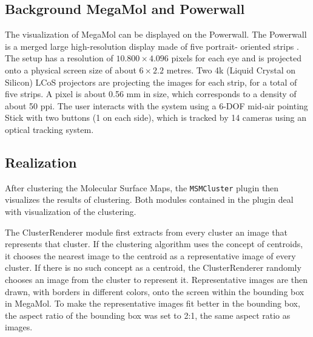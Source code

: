 \documentclass[journal]{vgtc}       %
\begin{document}
\subsection{Background MegaMol and Powerwall}

The visualization of MegaMol can be displayed on the Powerwall.
The  Powerwall is a merged large high-resolution display made of five portrait- oriented
strips . The setup has  a resolution of $10.800 \times 4.096 $ pixels
for each eye  and is projected onto a physical screen size of about $6 \times 2.2$ metres. 
Two 4k (Liquid Crystal on Silicon) LCoS projectors are projecting the images for each strip, for a total of five strips.
A pixel is about 0.56 mm  in size, which corresponds to a density of about 50 ppi.
The user interacts with the system using a 6-DOF mid-air
pointing Stick with two buttons (1 on each side), which is tracked by 14 cameras
using an optical tracking system. 




\subsection{Realization}

After clustering the Molecular Surface Maps, the \verb|MSMCluster| plugin then visualizes the results of clustering. Both modules contained in the plugin deal with visualization of the clustering. 

The ClusterRenderer module first extracts from every cluster an image that represents that cluster. If the clustering algorithm uses the concept of centroids, it chooses the nearest image to the centroid as a representative image of every cluster. If there is no such concept as a centroid, the  ClusterRenderer randomly chooses an image from the cluster to represent it. Representative images are then drawn, with borders in different colors, onto the screen within the bounding box in MegaMol. To make the representative images fit better in the bounding box, the aspect ratio of the bounding box was set to 2:1, the same aspect ratio as images.
\end{document}
